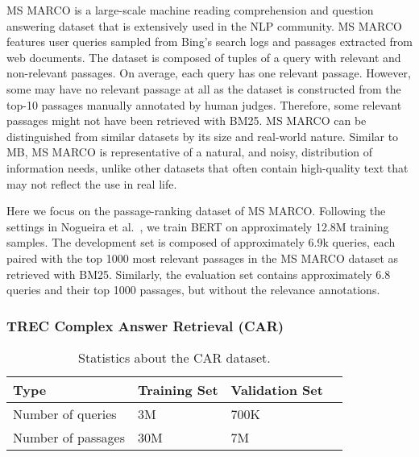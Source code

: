 MS MARCO is a large-scale machine reading comprehension and question answering dataset that is extensively used in the NLP community.
MS MARCO~\cite{nguyen2016msmarco} features user queries sampled from Bing’s search logs and passages extracted from web documents.
The dataset is composed of tuples of a query with relevant and non-relevant passages.
On average, each query has one relevant passage.
However, some may have no relevant passage at all as the dataset is constructed from the top-10 passages manually annotated by human judges.
Therefore, some relevant passages might not have been retrieved with BM25.
MS MARCO can be distinguished from similar datasets by its size and real-world nature.
Similar to MB, MS MARCO is representative of a natural, and noisy, distribution of information needs, unlike other datasets that often contain high-quality text that may not reflect the use in real life.

Here we focus on the passage-ranking dataset of MS MARCO.
Following the settings in Nogueira et al.~\cite{nogueira2019passage}, we train BERT on approximately 12.8M training samples.
The development set is composed of approximately 6.9k queries, each paired with the top 1000 most relevant passages in the MS MARCO dataset as retrieved with BM25.
Similarly, the evaluation set contains approximately 6.8 queries and their top 1000 passages, but without the relevance annotations.

\subsubsection{TREC Complex Answer Retrieval (CAR)}

\begin{table}[t!]
\vspace{0.2cm}
\centering
\begin{tabular}{llll}
\toprule
\textbf{Type} \mbox{\hspace{0.5cm}} & \textbf{Training Set} \mbox{\hspace{1.0cm}} & \textbf{Validation Set} \mbox{\hspace{1.0cm}} \\
\toprule
Number of queries & 3M & 700K \\
Number of passages & 30M & 7M \\
\bottomrule
\end{tabular}
\vspace{0.2cm}
\caption{Statistics about the CAR dataset.}
\label{tab:car-stats}
\end{table}

